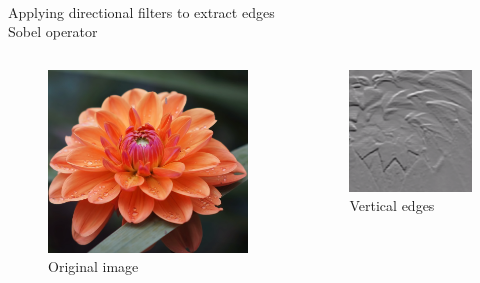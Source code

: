 \documentclass[accentcolor=tud4b,colorbacktitle,inverttitle,landscape,german,presentation,t]{tudbeamer}
\begin{document}
\begin{frame}{\\Applying directional filters to extract edges\\ \small{Sobel operator}}

\begin{columns}
\vspace{-1cm}
\begin{figure}
\includegraphics[scale=.385]{Sobel_1}
\caption{Original image \cite{youtube} }
\end{figure}



\vspace{-1cm}
\begin{figure}
\includegraphics[scale=.58]{Sobel_4_y}
\caption{Vertical edges \cite{youtube} }
\end{figure}

\vspace{-1cm}


\end{columns}
\end{frame}
\end{document}
